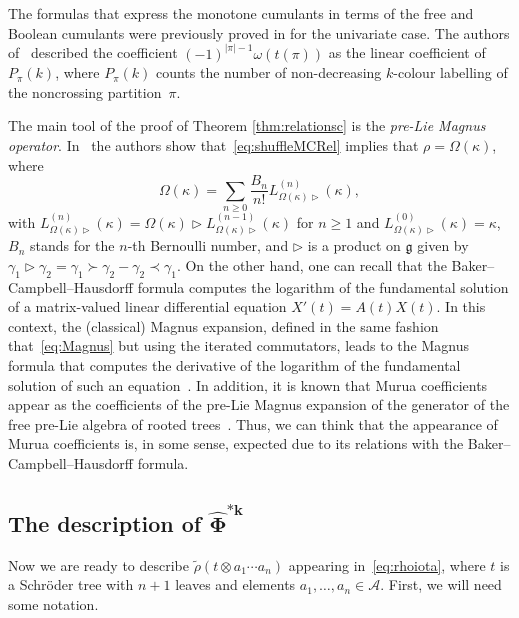 \documentclass[pdftex]{sigma}%
\numberwithin{equation}{section}
\newcommand{\A}{\mathcal{A}}
\begin{document}
\begin{Remark}The formulas that express the monotone cumulants in terms of the free and Boolean cumulants were previously proved in \cite{AHLV} for the univariate case. The authors of~\cite{AHLV} described the coefficient $(-1)^{|\pi|-1}\omega(t(\pi))$ as the linear coefficient of $P_\pi(k)$, where $P_\pi(k)$ counts the number of non-decreasing $k$-colour labelling of the noncrossing partition~$\pi$.
\end{Remark}

\begin{Remark}The main tool of the proof of Theorem \ref{thm:relationsc} is the \textit{pre-Lie Magnus operator}. In~\cite{EFP3} the authors show that~\eqref{eq:shuffleMCRel} implies that $\rho = \Omega(\kappa)$, where
\begin{equation}
 \label{eq:Magnus}
 \Omega(\kappa) = \sum_{n\geq0} \frac{B_n}{n!} L^{(n)}_{\Omega(\kappa)\rhd}(\kappa),
\end{equation}
with $L^{(n)}_{\Omega(\kappa)\rhd}(\kappa) = \Omega(\kappa) \rhd L^{(n-1)}_{\Omega(\kappa)\rhd}(\kappa)$ for $n\geq1$ and $L^{(0)}_{\Omega(\kappa)\rhd}(\kappa)=\kappa$, $B_n$ stands for the $n$-th Bernoulli number, and $\rhd$ is a product on $\mathfrak{g}$ given by $\gamma_1\rhd\gamma_2 = \gamma_1\succ\gamma_2 - \gamma_2\prec\gamma_1$. On the other hand, one can recall that the Baker--Campbell--Hausdorff formula computes the logarithm of the fundamental solution of a matrix-valued linear differential equation $X'(t) = A(t)X (t)$. In this context, the (classical) Magnus expansion, defined in the same fashion that~\eqref{eq:Magnus} but using the iterated commutators, leads to the Magnus formula that computes the derivative of the logarithm of the fundamental solution of such an equation~\cite{Iserles}. In addition, it is known that Murua coefficients appear as the coefficients of the pre-Lie Magnus expansion of the generator of the free pre-Lie algebra of rooted trees~\cite{CelPat}. Thus, we can think that the appearance of Murua coefficients is, in some sense, expected due to its relations with the Baker--Campbell--Hausdorff formula.
\end{Remark}

\subsection[The description of $\hat\Phi^{*k}$]{The description of $\boldsymbol{\hat\Phi^{*k}}$}\label{ssec:convolpower}

Now we are ready to describe $\tilde\rho(t\otimes a_1\cdots a_n)$ appearing in~\eqref{eq:rhoiota}, where $t$ is a Schr\"oder tree with $n+1$ leaves and elements $a_1,\dots, a_n\in \A$. First, we will need some notation.
\end{document}
